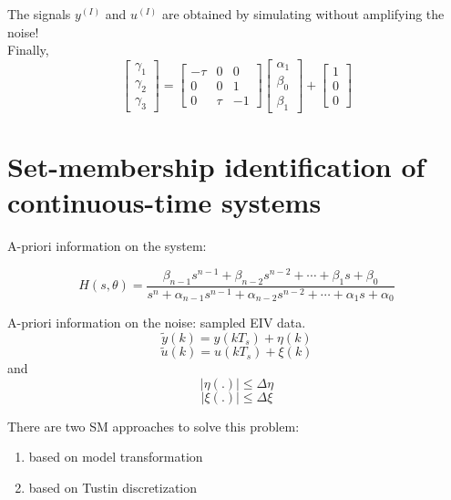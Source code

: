 \begin{enumerate}
The signals $y^{(I)}$ and $u^{(I)}$ are obtained by simulating without amplifying the noise! \\

Finally,
\[
\begin{bmatrix}
\gamma_1 \\
\gamma_2 \\
\gamma_3
\end{bmatrix}
=
\begin{bmatrix}
-\tau & 0 & 0 \\
0 & 0 & 1 \\
0 & \tau & -1
\end{bmatrix}
\begin{bmatrix}
\alpha_1 \\
\beta_0 \\
\beta_1
\end{bmatrix}
+
\begin{bmatrix}
1 \\
0 \\
0
\end{bmatrix}
\]
\end{enumerate}

\section{Set-membership identification of continuous-time systems}
A-priori information on the system:

\[
H(s, \theta) = \frac{\beta_{n-1}s^{n-1} + \beta_{n-2}s^{n-2} + \cdots + \beta_1s + \beta_0}{s^n + \alpha_{n-1}s^{n-1} + \alpha_{n-2}s^{n-2} + \cdots + \alpha_1s + \alpha_0}
\]

A-priori information on the noise: sampled EIV data.
\[
\tilde{y}(k) = y(k T_s) + \eta(k)\]
\[
\tilde{u}(k) = u(k T_s) + \xi(k)
\]
and 
\[
|\eta(.)| \leq \Delta\eta
\]
\[
|\xi(.)| \leq \Delta\xi
\]

There are two SM approaches to solve this problem:
\begin{enumerate}
    \item based on model transformation 
    \item based on Tustin discretization
\end{enumerate}

